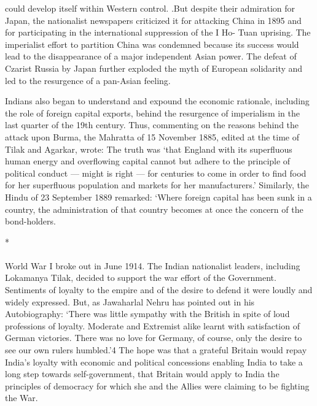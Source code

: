 could develop itself within Western control. .But despite their admiration for Japan, the nationalist newspapers criticized it for attacking China in 1895 and for participating in the international suppression of the I Ho- Tuan uprising. The imperialist effort to partition China was condemned because its success would lead to the disappearance of a major independent Asian power. The defeat of Czarist Russia by Japan further exploded the myth of European solidarity and led to the resurgence of a pan-Asian feeling. 

Indians also began to understand and expound the economic rationale, including the role of foreign capital exports, behind the resurgence of imperialism in the last quarter of the 19th century. Thus, commenting on the reasons behind the attack upon Burma, the Mahratta of 15 November 1885, edited at the time of Tilak and Agarkar, wrote: The truth was `that England with its superfluous human energy and overflowing capital cannot but adhere to the principle of political conduct --- might is right --- for centuries to come in order to find food for her superfluous population and markets for her manufacturers.' Similarly, the Hindu of 23 September 1889 remarked: `Where foreign capital has been sunk in a country, the administration of that country becomes at once the concern of the bond-holders.

\begin{center}*\end{center}

\paragraph*{}

World War I broke out in June 1914. The Indian nationalist leaders, including Lokamanya Tilak, decided to support the war effort of the Government. Sentiments of loyalty to the empire and of the desire to defend it were loudly and widely expressed. But, as Jawaharlal Nehru has pointed out in his Autobiography: `There was little sympathy with the British in spite of loud professions of loyalty. Moderate and Extremist alike learnt with satisfaction of German victories. There was no love for Germany, of course, only the desire to see our own rulers humbled.'4 The hope was that a grateful Britain would repay India's loyalty with economic and political concessions enabling India to take a long step towards self-government, that Britain would apply to India the principles of democracy for which she and the Allies were claiming to be fighting the War. 

